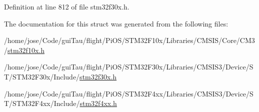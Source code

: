 Definition at line 812 of file stm32f30x.\-h.



The documentation for this struct was generated from the following files\-:\begin{DoxyCompactItemize}
\item 
/home/jose/\-Code/gui\-Tau/flight/\-Pi\-O\-S/\-S\-T\-M32\-F10x/\-Libraries/\-C\-M\-S\-I\-S/\-Core/\-C\-M3/\hyperlink{stm32f10x_8h}{stm32f10x.\-h}\item 
/home/jose/\-Code/gui\-Tau/flight/\-Pi\-O\-S/\-S\-T\-M32\-F30x/\-Libraries/\-C\-M\-S\-I\-S3/\-Device/\-S\-T/\-S\-T\-M32\-F30x/\-Include/\hyperlink{stm32f30x_8h}{stm32f30x.\-h}\item 
/home/jose/\-Code/gui\-Tau/flight/\-Pi\-O\-S/\-S\-T\-M32\-F4xx/\-Libraries/\-C\-M\-S\-I\-S3/\-Device/\-S\-T/\-S\-T\-M32\-F4xx/\-Include/\hyperlink{stm32f4xx_8h}{stm32f4xx.\-h}\end{DoxyCompactItemize}
